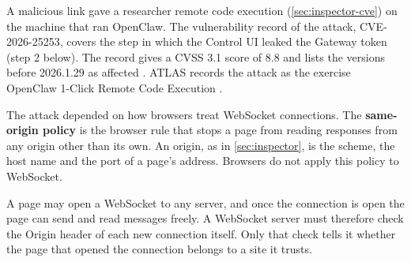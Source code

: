 A malicious link gave a researcher remote code execution (\cref{sec:inspector-cve}) on the machine
that ran OpenClaw. The vulnerability record of the attack, CVE-2026-25253, covers the step in
which the Control UI leaked the Gateway token (step 2 below). The record gives a CVSS 3.1 score of
8.8 and lists the versions before 2026.1.29 as affected \citep{nvd-cve-2026-25253}. ATLAS records the
attack as the exercise OpenClaw 1-Click Remote Code Execution \citep{atlas-cs0050-openclaw-rce}.

The attack depended on how browsers treat WebSocket connections. The \textbf{same-origin policy} is
the browser rule that stops a page from reading responses from any origin other than its own. An
origin, as in \cref{sec:inspector}, is the scheme, the host name and the port of a page's address.
Browsers do not apply this policy to WebSocket.

A page may open a WebSocket to any server, and once the connection is open the page can send and
read messages freely. A WebSocket server must therefore check the Origin header of each new
connection itself. Only that check tells it whether the page that opened the connection belongs to
a site it trusts.

